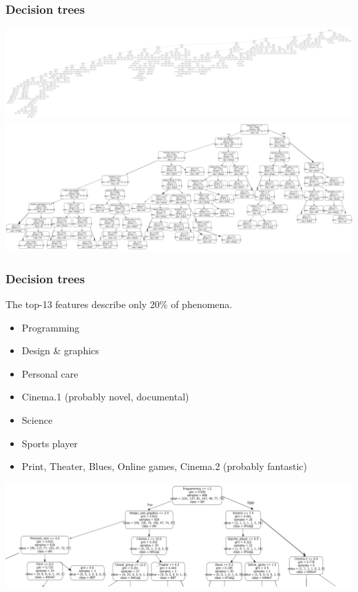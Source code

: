 \documentclass[10pt,dvipsnames]{beamer}
\begin{document}
\begin{frame}
  \frametitle{Decision trees}
  \centering
  \includegraphics[width=\linewidth]{pics/long-tree.png}
  \includegraphics[width=\linewidth]{pics/7-level-tree.png}
\end{frame}

\begin{frame}
  \frametitle{Decision trees}
  The top-13 features describe only 20\% of phenomena.
  \begin{itemize}
  \item Programming
  \item Design \& graphics
  \item Personal care
  \item Cinema.1 (probably novel, documental)
  \item Science
  \item Sports player
  \item Print, Theater, Blues, Online games, Cinema.2 (probably fantastic)
  \end{itemize}
  \centering
  \includegraphics[width=\linewidth]{pics/top-features.png}
\end{frame}
\end{document}
